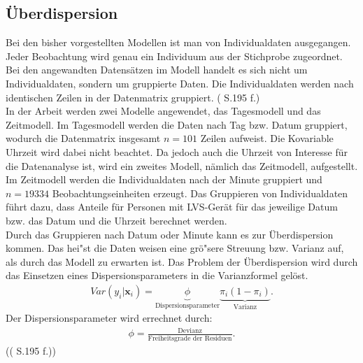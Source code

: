 \documentclass[12pt]{scrreprt}
\begin{document}
\subsection{Überdispersion}
Bei den bisher vorgestellten Modellen ist man von Individualdaten ausgegangen. Jeder Beobachtung wird genau ein Individuum aus der Stichprobe zugeordnet.
Bei den angewandten Datensätzen im Modell handelt es sich nicht um Individualdaten, sondern um gruppierte Daten. Die Individualdaten werden nach identischen Zeilen in der Datenmatrix gruppiert. (\cite{fahrmeir2007regression} S.195 f.) \\ 
In der Arbeit werden zwei Modelle angewendet, das Tagesmodell und das Zeitmodell.
Im Tagesmodell werden die Daten nach Tag bzw. Datum gruppiert, wodurch die Datenmatrix insgesamt $n = 101$ Zeilen aufweist. Die Kovariable Uhrzeit wird dabei nicht beachtet. Da jedoch auch die Uhrzeit von Interesse für die Datenanalyse ist, wird ein zweites Modell, nämlich das Zeitmodell, aufgestellt. Im Zeitmodell werden die Individualdaten nach der Minute gruppiert und $n = 19334$ Beobachtungseinheiten erzeugt. Das Gruppieren von Individualdaten führt dazu, dass Anteile für Personen mit LVS-Gerät für das jeweilige Datum bzw. das Datum und die Uhrzeit berechnet werden. \\
Durch das Gruppieren nach Datum oder Minute kann es zur Überdispersion kommen. Das hei"st die Daten weisen eine grö"sere Streuung bzw. Varianz auf, als durch das Modell zu erwarten ist. Das Problem der Überdispersion wird durch das Einsetzen eines Dispersionsparameters in die Varianzformel gelöst.
\begin{align}
Var(y_{i}|\textbf{x}_{i})=\underbrace{\phi}_\text{Dispersionsparameter} \underbrace{\pi_{i}(1-\pi_{i})}_\text{Varianz}.
\end{align}
Der Dispersionsparameter wird errechnet durch:
\begin{align}
\phi=\frac{\text{Devianz}}{\text{Freiheitsgrade der Residuen}}.
\end{align} 
({(\cite{fahrmeir2007regression} S.195 f.)})
\end{document}
